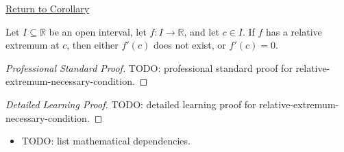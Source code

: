 \newpage
{}
\label{prf:relative-extremum-necessary-condition}

\begin{remark*}[Return]
\hyperref[cor:relative-extremum-necessary-condition]{Return to Corollary}
\end{remark*}

\begin{corollary*}
Let $I \subseteq \mathbb{R}$ be an open interval, let $f : I \to \mathbb{R}$, and let $c \in I$. If $f$ has a relative extremum at $c$, then either $f'(c)$ does not exist, or $f'(c) = 0$.
\end{corollary*}

\begin{proof}[Professional Standard Proof]
\LRAProofBodyStart
TODO: professional standard proof for relative-extremum-necessary-condition.
\end{proof}

\begin{proof}[Detailed Learning Proof]
\LRAProofBodyStart
TODO: detailed learning proof for relative-extremum-necessary-condition.
\end{proof}

\begin{remark*}
\end{remark*}

\begin{dependencies}
\begin{itemize}
  \item TODO: list mathematical dependencies.
\end{itemize}
\end{dependencies}

\clearpage
